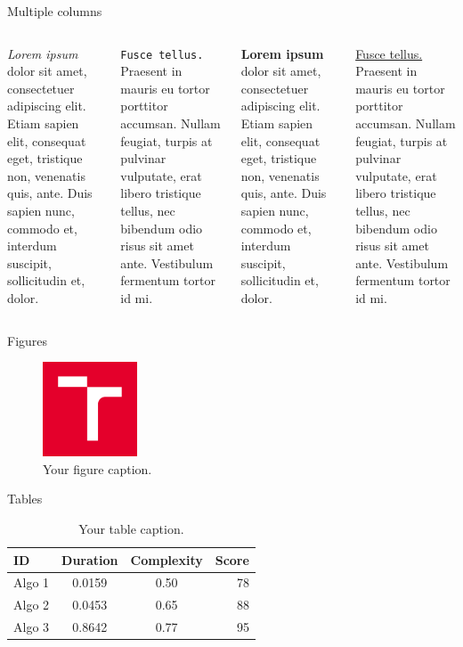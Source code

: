 \documentclass[aspectratio=1610]{beamer}
\begin{document}
\begin{frame}{Multiple columns}
    \begin{columns}
        \textit{Lorem ipsum} dolor sit amet, consectetuer adipiscing elit. Etiam sapien elit, consequat eget, tristique non, venenatis quis, ante. Duis sapien nunc, commodo et, interdum suscipit, sollicitudin et, dolor.
        \bigskip
        
        \texttt{Fusce tellus.} Praesent in mauris eu tortor porttitor accumsan. Nullam feugiat, turpis at pulvinar vulputate, erat libero tristique tellus, nec bibendum odio risus sit amet ante. Vestibulum fermentum tortor id mi.

        \textbf{Lorem ipsum} dolor sit amet, consectetuer adipiscing elit. Etiam sapien elit, consequat eget, tristique non, venenatis quis, ante. Duis sapien nunc, commodo et, interdum suscipit, sollicitudin et, dolor.
        \bigskip
        
        \underline{Fusce tellus.} Praesent in mauris eu tortor porttitor accumsan. Nullam feugiat, turpis at pulvinar vulputate, erat libero tristique tellus, nec bibendum odio risus sit amet ante. Vestibulum fermentum tortor id mi.
    \end{columns}
\end{frame}

\begin{frame}{Figures}
    \begin{figure}
        \centering
        \includegraphics[width=0.25\textwidth]{Images/logo.png}
        \caption{Your figure caption.}
    \end{figure}
\end{frame}

\begin{frame}{Tables}
    \begin{table}
        \centering
        \caption{Your table caption.}
        \begin{tabular}{l | c | c | r}
            \hline
            \textbf{ID} & \textbf{Duration} & \textbf{Complexity} & \textbf{Score}\\
            \hline
            Algo 1 & 0.0159 & 0.50 & 78\\
            Algo 2 & 0.0453 & 0.65 & 88\\
            Algo 3 & 0.8642 & 0.77 & 95\\
            \hline
        \end{tabular}
    \end{table}
\end{frame}
\end{document}
